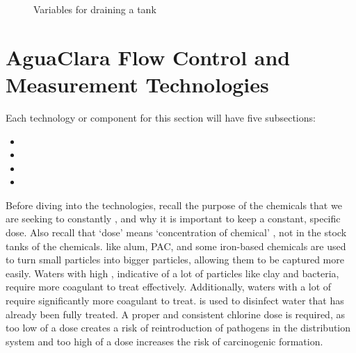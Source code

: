 \documentclass[letterpaper,10pt,english]{sphinxmanual}
\let\sphinxpxdimen\pdfpxdimen\else\newdimen\sphinxpxdimen
\begin{document}
\begin{figure}[htbp]
\centering
\capstart

\noindent\sphinxincludegraphics[width=600\sphinxpxdimen]{{pipe_stub_drainage_variables}.png}
\caption{Variables for draining a tank}\label{\detokenize{Flow_Control_and_Measurement/FCM_Design:id15}}\label{\detokenize{Flow_Control_and_Measurement/FCM_Design:pipe-stub-drainage-variables-in-derivation}}\end{figure}


\section{AguaClara Flow Control and Measurement Technologies}
\label{\detokenize{Flow_Control_and_Measurement/FCM_Design:aguaclara-flow-control-and-measurement-technologies}}\label{\detokenize{Flow_Control_and_Measurement/FCM_Design:id3}}
Each technology or component for this section will have five subsections:
\begin{itemize}
\item {} 

\item {} 

\item {} 

\item {} 

\end{itemize}

Before diving into the technologies, recall the purpose of the chemicals that we are seeking to constantly , and why it is important to keep a constant, specific dose. Also recall that ‘dose’ means ‘concentration of chemical’ , not in the stock tanks of the chemicals.  like alum, PAC, and some iron-based chemicals are used to turn small particles into bigger particles, allowing them to be captured more easily. Waters with high , indicative of a lot of particles like clay and bacteria, require more coagulant to treat effectively. Additionally, waters with a lot of  require significantly more coagulant to treat.  is used to disinfect water that has already been fully treated. A proper and consistent chlorine dose is required, as too low of a dose creates a risk of reintroduction of pathogens in the distribution system and too high of a dose increases the risk of carcinogenic  formation.
\end{document}
